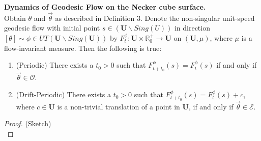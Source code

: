 \documentclass[]{article}
\begin{document}
\begin{conj}{\textbf{Dynamics of Geodesic Flow on the Necker cube surface.}}\\ Obtain $\theta$ and $\vec{\theta}$ as described in Definition 3. Denote the non-singular unit-speed geodesic flow with initial point $s\in(\mathbf{U}\backslash Sing(U))$ in direction $[\theta]\sim\phi\in UT(\mathbf{U}\backslash Sing(\mathbf U))$ by $F_t^{\phi}:\mathbf{U}\times\mathbb{R}_0^+\rightarrow\mathbf{U}$ on $(\mathbf{U},\mu)$, where $\mu$ is a flow-invariant measure.  Then the following is true:
\begin{enumerate}[label=(\roman*)]
\item (Periodic) There exists a $t_0 > 0$ such that $F^{\phi}_{t+t_{0}}(s)=F^{\phi}_{t}(s)$ if and only if $\vec{\theta}\in\mathcal{O}$.
\item (Drift-Periodic) There exists a $t_0 > 0$ such that $F^{\phi}_{t+t_{0}}(s)= F^{\phi}_{t}(s)+c$, where $c\in \mathbf{U}$ is a non-trivial translation of a point in $\mathbf{U}$, if and only if $\vec{\theta}\in\mathcal{E}$.
\end{enumerate}
\begin{proof}(Sketch)\\

\end{proof}
\end{conj}
\end{document}

